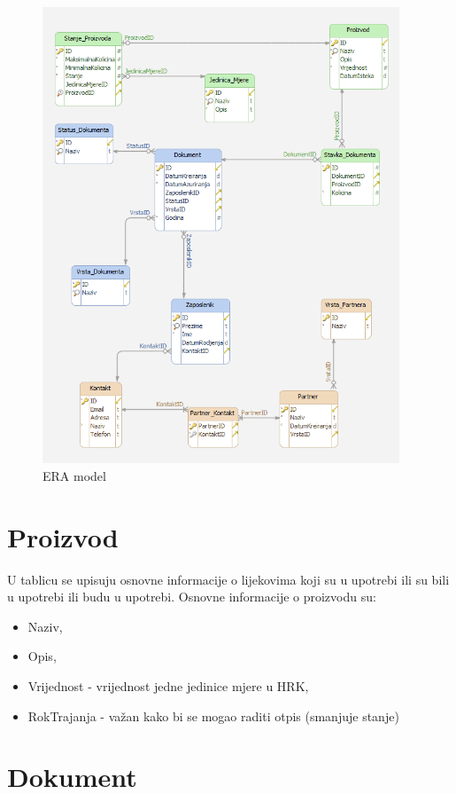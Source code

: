 \documentclass[a4paper,12pt]{foi}
\begin{document}
\begin{figure}[h]
\centering 
\includegraphics[width=0.95\textwidth]{model.png}
\caption{ERA model}
\label{slika-1}
\end{figure}

\section{Proizvod}

U tablicu se upisuju osnovne informacije o lijekovima koji su u upotrebi ili su bili u upotrebi ili budu u upotrebi. Osnovne informacije o proizvodu su: 

\begin{itemize}
	\item Naziv, 
	\item Opis,
	\item Vrijednost - vrijednost jedne jedinice mjere u HRK,
	\item RokTrajanja - važan kako bi se mogao raditi otpis (smanjuje stanje)
\end{itemize}

\section{Dokument}
\end{document}
